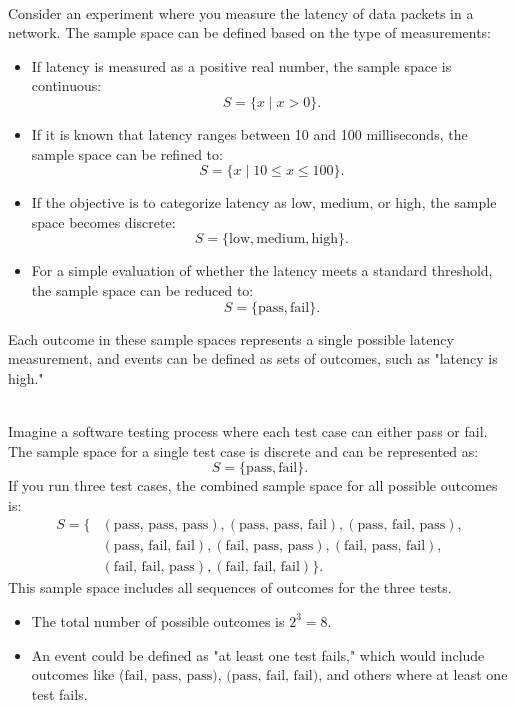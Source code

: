 \begin{example} \\
Consider an experiment where you measure the latency of data packets in a network. The sample space can be defined based on the type of measurements:
\begin{itemize}
    \item If latency is measured as a positive real number, the sample space is continuous: 
    \[
    S = \{ x \mid x > 0 \}.
    \]
    \item If it is known that latency ranges between 10 and 100 milliseconds, the sample space can be refined to:
    \[
    S = \{ x \mid 10 \leq x \leq 100 \}.
    \]
    \item If the objective is to categorize latency as low, medium, or high, the sample space becomes discrete:
    \[
    S = \{\text{low}, \text{medium}, \text{high}\}.
    \]
    \item For a simple evaluation of whether the latency meets a standard threshold, the sample space can be reduced to:
    \[
    S = \{\text{pass}, \text{fail}\}.
    \]
\end{itemize}
Each outcome in these sample spaces represents a single possible latency measurement, and events can be defined as sets of outcomes, such as "latency is high."

\end{example}

\begin{example} \\
    Imagine a software testing process where each test case can either pass or fail. The sample space for a single test case is discrete and can be represented as:
    \[
    S = \{\text{pass}, \text{fail}\}.
    \]
    If you run three test cases, the combined sample space for all possible outcomes is:
    \begin{align*}
    S = \{&(\text{pass, pass, pass}), (\text{pass, pass, fail}), (\text{pass, fail, pass}), \\
    &(\text{pass, fail, fail}), (\text{fail, pass, pass}), (\text{fail, pass, fail}), \\
    &(\text{fail, fail, pass}), (\text{fail, fail, fail})\}.
    \end{align*}
    This sample space includes all sequences of outcomes for the three tests.
    
    \begin{itemize}
        \item The total number of possible outcomes is \( 2^3 = 8 \).
        \item An event could be defined as "at least one test fails," which would include outcomes like \(\text{(fail, pass, pass)}\), \(\text{(pass, fail, fail)}\), and others where at least one test fails.
    \end{itemize}
    
    \end{example}
    

